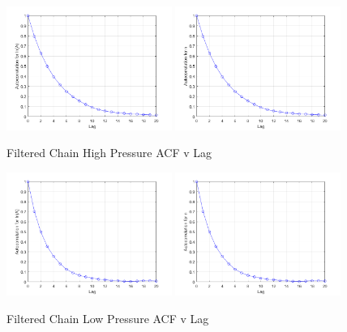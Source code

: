 \documentclass{article}
\begin{document}
\begin{figure}[htb!]
\centering
\includegraphics[width=0.48\textwidth]{ACF_lnA_filt_HP.png}
\includegraphics[width=0.48\textwidth]{ACF_n_filt_HP.png}
\caption{Filtered Chain High Pressure ACF v Lag}
\label{autoHP}
\end{figure}

\begin{figure}[htb!]
\centering
\includegraphics[width=0.48\textwidth]{ACF_lnA_filt_LP.png}
\includegraphics[width=0.48\textwidth]{ACF_n_filt_LP.png}
\caption{Filtered Chain Low Pressure ACF v Lag}
\label{autoLP}
\end{figure}
\end{document}
